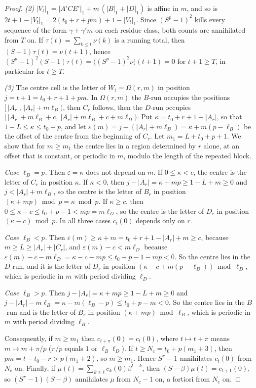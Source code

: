 \documentclass[11pt]{article}
\theoremstyle{definition}
\theoremstyle{remark}
\begin{document}
\begin{proof}
\emph{(2)} $|V_t|_1=|A'CE'|_1+m\,(|B|_1+|D|_1)$ is affine in $m$, and so is $2t+1-|V_t|_1=2(t_0+r+pm)+1-|V_t|_1$. Since $(S^p-1)^2$ kills every sequence of the form $\gamma+\gamma'm$ on each residue class, both counts are annihilated from $T$ on. If $\tau(t)=\sum_{k\le t}\nu(k)$ is a running total, then $(S-1)\tau(t)=\nu(t+1)$, hence $(S^p-1)^2(S-1)\tau(t)=\bigl((S^p-1)^2\nu\bigr)(t+1)=0$ for $t+1\ge T$, in particular for $t\ge T$.

\emph{(3)} The centre cell is the letter of $W_t=\Omega(r,m)$ in position $j=t+1=t_0+r+1+pm$. In $\Omega(r,m)$ the $B$-run occupies the positions $[\,|A_r|,\,|A_r|+m\ell_B)$, then $C_r$ follows, then the $D$-run occupies $[\,|A_r|+m\ell_B+c,\ |A_r|+m\ell_B+c+m\ell_D)$. Put $\kappa=t_0+r+1-|A_r|$, so that $1-L\le\kappa\le t_0+p$, and let $\varepsilon(m)=j-(|A_r|+m\ell_B)=\kappa+m(p-\ell_B)$ be the offset of the centre from the beginning of $C_r$. Let $m_1=L+t_0+p+1$. We show that for $m\ge m_1$ the centre lies in a region determined by $r$ alone, at an offset that is constant, or periodic in $m$, modulo the length of the repeated block.

\emph{Case $\ell_B=p$.} Then $\varepsilon=\kappa$ does not depend on $m$. If $0\le\kappa<c$, the centre is the letter of $C_r$ in position $\kappa$. If $\kappa<0$, then $j-|A_r|=\kappa+mp\ge 1-L+m\ge0$ and $j<|A_r|+m\ell_B$, so the centre is the letter of $B_r$ in position $(\kappa+mp)\bmod p=\kappa\bmod p$. If $\kappa\ge c$, then $0\le\kappa-c\le t_0+p-1<mp=m\ell_D$, so the centre is the letter of $D_r$ in position $(\kappa-c)\bmod p$. In all three cases $c_t(0)$ depends only on $r$.

\emph{Case $\ell_B<p$.} Then $\varepsilon(m)\ge\kappa+m=t_0+r+1-|A_r|+m\ge c$, because $m\ge L\ge|A_r|+|C_r|$, and $\varepsilon(m)-c<m\ell_D$ because $\varepsilon(m)-c-m\ell_D=\kappa-c-mp\le t_0+p-1-mp<0$. So the centre lies in the $D$-run, and it is the letter of $D_r$ in position $(\kappa-c+m(p-\ell_B))\bmod\ell_D$, which is periodic in $m$ with period dividing $\ell_D$.

\emph{Case $\ell_B>p$.} Then $j-|A_r|=\kappa+mp\ge 1-L+m\ge0$ and $j-|A_r|-m\ell_B=\kappa-m(\ell_B-p)\le t_0+p-m<0$. So the centre lies in the $B$-run and is the letter of $B_r$ in position $(\kappa+mp)\bmod\ell_B$, which is periodic in $m$ with period dividing $\ell_B$.

Consequently, if $m\ge m_1$ then $c_{t+\pi}(0)=c_t(0)$, where $t\mapsto t+\pi$ means $m\mapsto m+\pi/p$ ($\pi/p$ equals $1$ or $\ell_B\ell_D$). If $t\ge N_{\mathrm c}=t_0+p(m_1+3)$, then $pm=t-t_0-r>p(m_1+2)$, so $m\ge m_1$. Hence $S^\pi-1$ annihilates $c_t(0)$ from $N_{\mathrm c}$ on. Finally, if $\mu(t)=\sum_{k\le t}c_k(0)\beta^{t-k}$, then $(S-\beta)\mu(t)=c_{t+1}(0)$, so $(S^\pi-1)(S-\beta)$ annihilates $\mu$ from $N_{\mathrm c}-1$ on, a fortiori from $N_{\mathrm c}$ on.
\end{proof}
\end{document}
